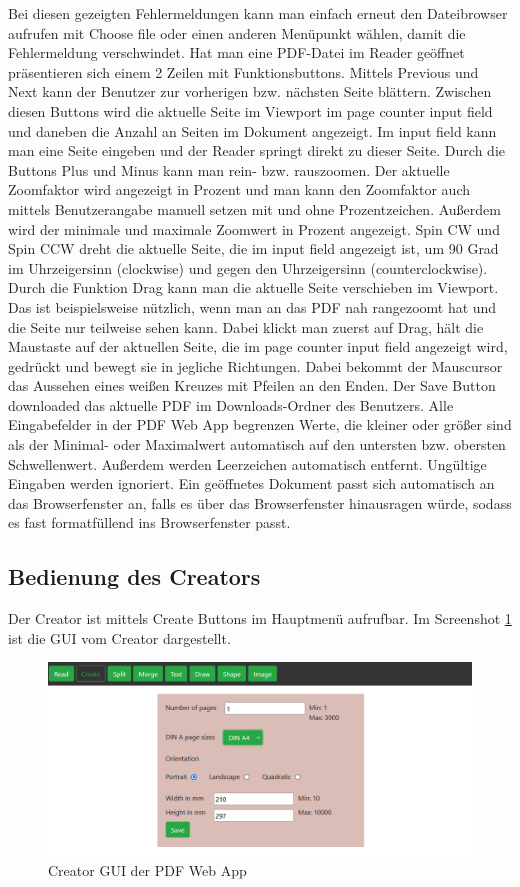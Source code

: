 Bei diesen gezeigten Fehlermeldungen kann man einfach erneut den Dateibrowser aufrufen mit Choose file oder einen anderen Menüpunkt wählen, damit die Fehlermeldung verschwindet. Hat man eine PDF-Datei im Reader geöffnet präsentieren sich einem 2 Zeilen mit Funktionsbuttons. Mittels Previous und Next kann der Benutzer zur vorherigen bzw. nächsten Seite blättern. Zwischen diesen Buttons wird die aktuelle Seite im Viewport im page counter input field und daneben die Anzahl an Seiten im Dokument angezeigt. Im input field kann man eine Seite eingeben und der Reader springt direkt zu dieser Seite. Durch die Buttons Plus und Minus kann man rein- bzw. rauszoomen. Der aktuelle Zoomfaktor wird angezeigt in Prozent und man kann den Zoomfaktor auch mittels Benutzerangabe manuell setzen mit und ohne Prozentzeichen. Außerdem wird der minimale und maximale Zoomwert in Prozent angezeigt. Spin CW und Spin CCW dreht die aktuelle Seite, die im input field angezeigt ist, um 90 Grad im Uhrzeigersinn (clockwise) und gegen den Uhrzeigersinn (counterclockwise). Durch die Funktion Drag kann man die aktuelle Seite verschieben im Viewport. Das ist beispielsweise nützlich, wenn man an das PDF nah rangezoomt hat und die Seite nur teilweise sehen kann. Dabei klickt man zuerst auf Drag, hält die Maustaste auf der aktuellen Seite, die im page counter input field angezeigt wird, gedrückt und bewegt sie in jegliche Richtungen. Dabei bekommt der Mauscursor das Aussehen eines weißen Kreuzes mit Pfeilen an den Enden. Der Save Button downloaded das aktuelle PDF im Downloads-Ordner des Benutzers. Alle Eingabefelder in der PDF Web App begrenzen Werte, die kleiner oder größer sind als der Minimal- oder Maximalwert automatisch auf den untersten bzw. obersten Schwellenwert. Außerdem werden Leerzeichen automatisch entfernt. Ungültige Eingaben werden ignoriert. Ein geöffnetes Dokument passt sich automatisch an das Browserfenster an, falls es über das Browserfenster hinausragen würde, sodass es fast formatfüllend ins Browserfenster passt. \\

\subsection{Bedienung des Creators}
Der Creator ist mittels Create Buttons im Hauptmenü aufrufbar. Im Screenshot \ref{fig:creator} ist die GUI vom Creator dargestellt. 

\begin{figure}[!htbp]
	\centering
	\includegraphics[width=1\textwidth]{"images/creator.png"}
	\caption{Creator GUI der PDF Web App}
	\label{fig:creator}
\end{figure}


